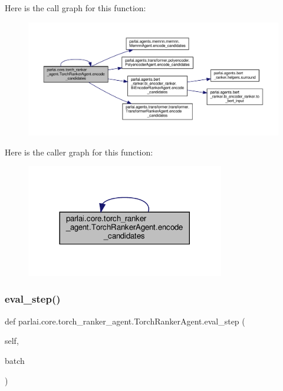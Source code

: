 Here is the call graph for this function\+:
\nopagebreak
\begin{figure}[H]
\begin{center}
\leavevmode
\includegraphics[width=350pt]{classparlai_1_1core_1_1torch__ranker__agent_1_1TorchRankerAgent_a1c8e4925f558783a51a28ccb577c42c7_cgraph}
\end{center}
\end{figure}
Here is the caller graph for this function\+:
\nopagebreak
\begin{figure}[H]
\begin{center}
\leavevmode
\includegraphics[width=245pt]{classparlai_1_1core_1_1torch__ranker__agent_1_1TorchRankerAgent_a1c8e4925f558783a51a28ccb577c42c7_icgraph}
\end{center}
\end{figure}
\mbox{\label{classparlai_1_1core_1_1torch__ranker__agent_1_1TorchRankerAgent_a65bca7841123e4c3df1e09f8c4eb397f}} 
\subsubsection{\texorpdfstring{eval\+\_\+step()}{eval\_step()}}
{\footnotesize\ttfamily def parlai.\+core.\+torch\+\_\+ranker\+\_\+agent.\+Torch\+Ranker\+Agent.\+eval\+\_\+step (\begin{DoxyParamCaption}\item[{}]{self,  }\item[{}]{batch }\end{DoxyParamCaption})}

